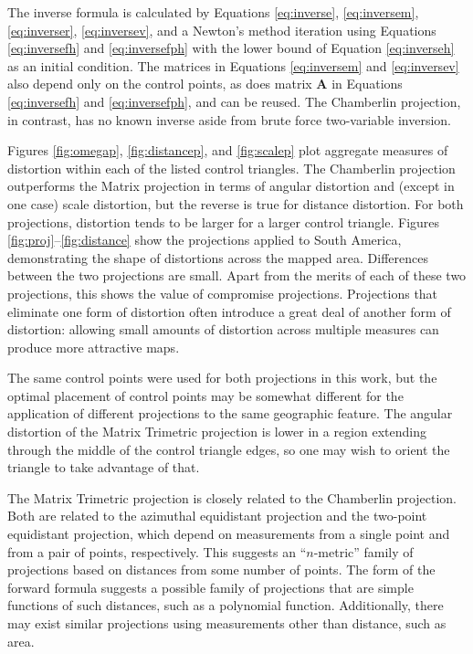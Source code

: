 \documentclass[]{interact}
\begin{document}
The inverse formula is calculated by Equations \ref{eq:inverse},
\ref{eq:inversem}, \ref{eq:inverser}, \ref{eq:inversev}, and a Newton's method
iteration using Equations \ref{eq:inversefh} and \ref{eq:inversefph} with the
lower bound of Equation \ref{eq:inverseh} as an initial condition. The matrices
in Equations \ref{eq:inversem} and \ref{eq:inversev} also depend only on the
control points, as does matrix $\mathbf A$ in Equations \ref{eq:inversefh} and
\ref{eq:inversefph}, and can be reused. The Chamberlin projection, in contrast,
has no known inverse aside from brute force two-variable inversion.

Figures \ref{fig:omegap}, \ref{fig:distancep}, and \ref{fig:scalep} plot
aggregate measures of distortion within each of the listed control triangles.
The Chamberlin projection outperforms the Matrix projection in terms of
angular distortion and (except in one case) scale distortion, but the reverse
is true for distance distortion. For both projections, distortion tends
to be larger for a larger control triangle. Figures
\ref{fig:proj}--\ref{fig:distance} show the projections applied to South
America, demonstrating the shape of distortions across the mapped area.
Differences between the two projections are small. Apart from the merits of
each of these two projections, this shows the value of compromise projections.
Projections that eliminate one form of distortion often introduce a great deal
of another form of distortion: allowing small amounts of distortion across
multiple measures can produce more attractive maps.

The same control points were used for both projections in this work, but the
optimal placement of control points may be somewhat different for the
application of different projections to the same geographic feature.
The angular distortion of the Matrix Trimetric projection is lower
in a region extending through the middle of the control triangle edges,
so one may wish to orient the triangle to take advantage of that.

The Matrix Trimetric projection is closely related to the Chamberlin projection.
Both are related to the azimuthal equidistant projection and the two-point
equidistant projection, which depend on measurements from a single point and
from a pair of points, respectively.\citep{snyder87} This suggests an
``$n$-metric'' family of projections based on distances from some number of
points. The form of the forward formula suggests a possible family of
projections that are simple functions of such distances, such as a polynomial
function. Additionally, there may exist similar projections using measurements
other than distance, such as area.
\end{document}
